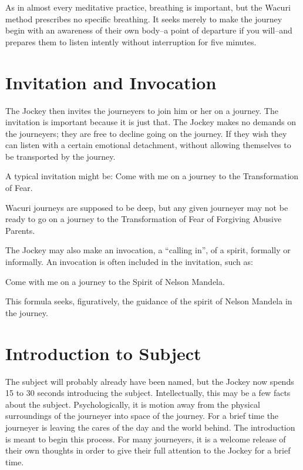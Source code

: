 \documentclass[12pt]{book}
\begin{document}
As in almost every meditative practice, breathing is important, but the Wacuri method prescribes no specific breathing. It seeks merely to make the journey begin with an awareness of their own body–a point of departure if you will–and prepares them to listen intently without interruption for five minutes.
					
\section{Invitation and Invocation}
					
The Jockey then invites the journeyers to join him or her on a journey. The invitation is important because it is just that. The Jockey makes no demands on the journeyers; they are free to decline going on the journey. If they wish they can listen with a certain emotional detachment, without allowing themselves to be transported by the journey.
					
A typical invitation might be:
Come with me on a journey to the Transformation of Fear.
					
Wacuri journeys are supposed to be deep, but any given journeyer may not be ready to go on a journey to the Transformation of Fear of Forgiving Abusive Parents.
					
The Jockey may also make an invocation, a “calling in”, of a spirit, formally or informally. An invocation is often included in the invitation, such as:
					
Come with me on a journey to the Spirit of Nelson Mandela.
					
This formula seeks, figuratively, the guidance of the spirit of Nelson Mandela in the journey.

\section{Introduction to Subject}
					
The subject will probably already have been named, but the Jockey now spends 15 to 30 seconds introducing the subject. Intellectually, this may be a few facts about the subject. Psychologically, it is motion away from the physical surroundings of the journeyer into space of the journey. For a brief time the journeyer is leaving the cares of the day and the world behind. The introduction is meant to begin this process. For many journeyers, it is a welcome release of their own thoughts in order to give their full attention to the Jockey for a brief time.
					
\end{document}
